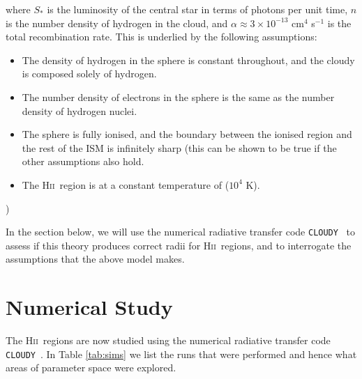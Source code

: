 \documentclass[a4paper]{article}
\newcommand{\hii}{H\textsc{ii}~}
\newcommand{\cloudy}{{\tt CLOUDY}~}
\begin{document}
where $S_*$ is the luminosity of the central star in terms of photons per unit
time, $n$ is the number density of hydrogen in the cloud, and $\alpha
\approx 3\times 10^{-13}$ cm$^{4}$ s$^{-1}$ is the total recombination rate.
This is underlied by the following assumptions:
\begin{itemize}
    \item The density of hydrogen in the sphere is constant throughout, and
          the cloudy is composed solely of hydrogen.
    \item The number density of electrons in the sphere is the same as
          the number density of hydrogen nuclei.
    \item The sphere is fully ionised, and the boundary between the ionised
          region and the rest of the ISM is infinitely sharp (this can be shown
          to be true if the other assumptions also hold.
    \item The \hii region is at a constant temperature of ($10^{4}$ K).
\end{itemize})

In the section below, we will use the numerical radiative transfer code
\cloudy \citep{ferland_2017_2017} to assess if this theory produces
correct radii for \hii regions, and to interrogate the assumptions that the
above model makes.

\section{Numerical Study}

The \hii regions are now studied using the numerical radiative transfer code
\cloudy \citep{ferland_2017_2017}. In Table \ref{tab:sims} we list the
runs that were performed and hence what areas of parameter space were explored.
\end{document}
